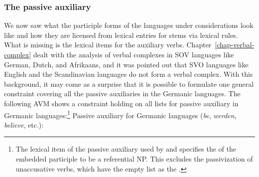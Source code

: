 
\subsubsection{The passive auxiliary}
\label{sec-auxiliary}

We now saw what the participle forms of the languages under considerations look like and how they are
licensed from lexical entries for stems via lexical rules. What is missing is the lexical items for
the auxiliary verbs. Chapter~\ref{chap-verbal-complex} dealt with the analysis of verbal complexes in SOV languages like
German, Dutch, and Afrikaans, and it was pointed out that SVO languages like English and the
Scandinavian languages do not form a verbal complex. With this background, it may come as a surprise
that it is possible to formulate one general constraint covering all the passive auxiliaries in the
Germanic languages. The following AVM shows a constraint holding on all \argst lists for passive
auxiliary in Germanic languages:\footnote{%
The lexical item of the passive auxiliary used by \citet[]{Mueller2002b} and \citet[]{MOe2013a}
specifies the \dav of the embedded participle to be a referential NP. This excludes the
passivization of unaccusative verbs, which have the empty list as the \dav.
} 
\ea
\label{le-passive-aux-arg-st}
Passive auxiliary for Germanic languages (\emph{be}, \emph{werden}, \emph{believe}, etc.):\\
\z

\noindent

